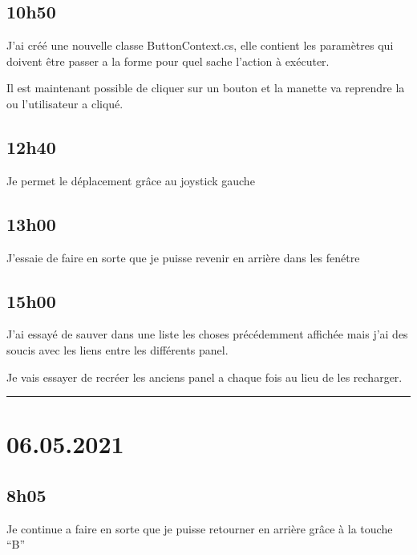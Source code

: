 \documentclass[a4paper,12pt,french]{sphinxmanual}
\begin{document}
\sphinxAtStartPar
{}


\subsection{10h50}
\label{\detokenize{logbook:id72}}
\sphinxAtStartPar
J’ai créé une nouvelle classe ButtonContext.cs, elle contient les paramètres qui doivent être passer a la forme pour quel sache l’action à exécuter.

\sphinxAtStartPar
Il est maintenant possible de cliquer sur un bouton et la manette va reprendre la ou l’utilisateur a cliqué.


\subsection{12h40}
\label{\detokenize{logbook:id73}}
\sphinxAtStartPar
Je permet le déplacement grâce au joystick gauche


\subsection{13h00}
\label{\detokenize{logbook:id74}}
\sphinxAtStartPar
J’essaie de faire en sorte que je puisse revenir en arrière dans les fenétre


\subsection{15h00}
\label{\detokenize{logbook:id75}}
\sphinxAtStartPar
J’ai essayé de sauver dans une liste les choses précédemment affichée mais j’ai des soucis avec les liens entre les différents panel.

\sphinxAtStartPar
Je vais essayer de recréer les anciens panel a chaque fois au lieu de les recharger.


\bigskip\hrule\bigskip



\section{06.05.2021}
\label{\detokenize{logbook:id76}}

\subsection{8h05}
\label{\detokenize{logbook:id77}}
\sphinxAtStartPar
Je continue a faire en sorte que je puisse retourner en arrière grâce à la touche “B”
\end{document}
